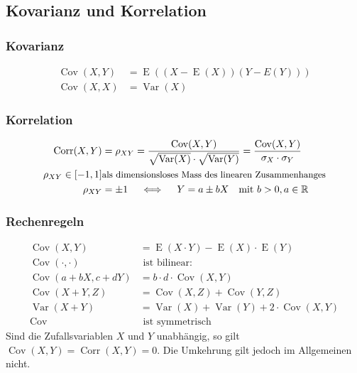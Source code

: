 \documentclass[25pt]{sciposter}
\newcommand{\R}{\mathbb{R}}
\newcommand{\Var}{\operatorname{Var}}
\newcommand{\E}{\operatorname{E}}
\begin{document}
\begin{multicols}{3}
\section*{Kovarianz und Korrelation}

\subsubsection*{Kovarianz}

\begin{align*}	
\operatorname{Cov}(X,Y) &= \E\left(\left(X-\E(X)\right)\left(Y-E(Y)\right)\right) \\
\operatorname{Cov}(X,X) &= \Var(X)
\end{align*}

\subsubsection*{Korrelation}
	\begin{align*}
\operatorname{Corr}(X,Y) &= \rho_{XY} = \frac{\operatorname{Cov}(X,Y)}{\sqrt{\Var(X)} \cdot \sqrt{\Var(Y)}}
= \frac{\operatorname{Cov}(X,Y)}{\sigma_X\cdot\sigma_Y} \\
\rho_{XY} \in [-1,1] &  \text{\small als dimensionsloses Mass des linearen Zusammenhanges} \\
\rho_{XY} &=\pm 1 \quad \iff \quad Y = a\pm bX \quad \text{mit }b>0, a \in \R
	\end{align*}

\subsubsection*{Rechenregeln}
\begin{align*}
\operatorname{Cov}(X,Y) &= \E(X\cdot Y) - \E(X) \cdot \E(Y) \\
\operatorname{Cov}(\cdot,\cdot) &\text{ ist bilinear:} \quad \\
\operatorname{Cov}(a+bX,c+dY) &= b\cdot d \cdot \operatorname{Cov} (X,Y) \\
\operatorname{Cov}(X+Y,Z) &= \operatorname{Cov}(X,Z)+\operatorname{Cov}(Y,Z) \\
\Var(X+Y) &= \Var(X)+\Var(Y)+2 \cdot \operatorname{Cov}(X,Y) \\
\operatorname{Cov} &\text{ ist symmetrisch}
\end{align*}
Sind die Zufallsvariablen $X$ und $Y$ unabhängig, so gilt $\operatorname{Cov}(X,Y) = \operatorname{Corr}(X,Y) = 0$.
Die Umkehrung gilt jedoch im Allgemeinen nicht.



\end{multicols}
\end{document}
